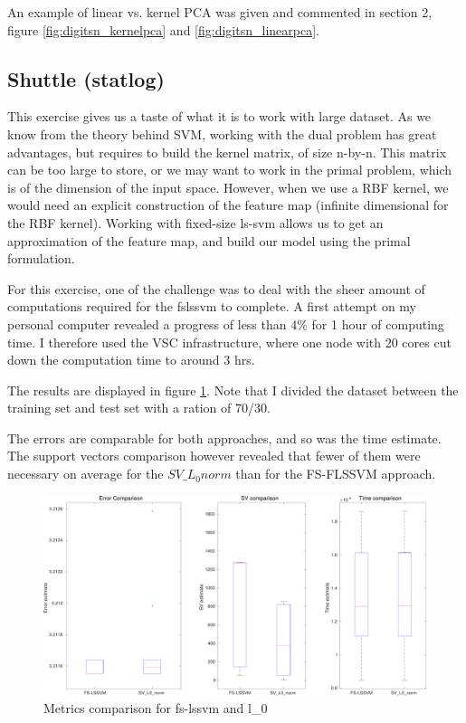 \documentclass[11pt, a4paper]{article}
\begin{document}
An example of linear vs. kernel PCA was given and commented in section
2, figure \ref{fig:digitsn_kernelpca} and \ref{fig:digitsn_linearpca}. 

\subsection{Shuttle (statlog)}

This exercise gives us a taste of what it is to work with large
dataset. As we know from the theory behind SVM, working with the dual
problem has great advantages, but requires to build the kernel matrix,
of size n-by-n. This matrix can be too large to store, or we may want
to work in the primal problem, which is of the dimension of the input
space. However, when we use a RBF kernel, we would need an explicit
construction of the feature map (infinite dimensional for the RBF
kernel). Working with fixed-size ls-svm allows us to get an
approximation of the feature map, and build our model using the primal
formulation.

For this exercise, one of the challenge was to deal with the sheer
amount of computations required for the fslssvm to complete. A first
attempt on my personal computer revealed a progress of less than 4\%
for 1 hour of computing time. I therefore used the VSC infrastructure,
where one node with 20 cores cut down the computation time to around 3
hrs.

The results are displayed in figure \ref{fig:fslssvm_shuttle}. Note
that I divided the dataset between the training set and test set with
a ration of 70/30.

The errors are comparable for both approaches, and so was the time
estimate. The support vectors comparison however revealed that fewer
of them were necessary on average for the $SV\_L_0 norm$ than for the
FS-FLSSVM approach.

\begin{figure}[H]
  \centering
  \includegraphics[scale=.36]{fslssvm_shuttle.pdf}
  \caption{Metrics comparison for fs-lssvm and l\_0}
  \label{fig:fslssvm_shuttle}
\end{figure}
\end{document}
